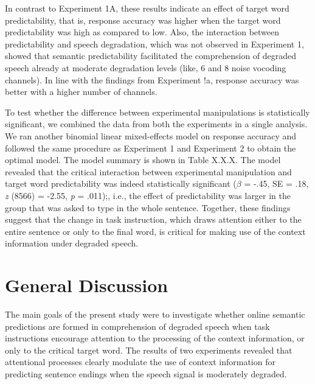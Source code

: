 \documentclass[a4paper, nobind]{templates/ociamthesis}
\begin{document}
In contrast to Experiment 1A, these results indicate an effect of target word predictability, that is, response accuracy was higher when the target word predictability was high as compared to low.
Also, the interaction between predictability and speech degradation, which was not observed in Experiment 1, showed that semantic predictability facilitated the comprehension of degraded speech already at moderate degradation levels (like, 6 and 8 noise vocoding channels).
In line with the findings from Experiment !a, response accuracy was better with a higher number of channels.

To test whether the difference between experimental manipulations is statistically significant, we combined the data from both the experiments in a single analysis.
We ran another binomial linear mixed-effects model on response accuracy and followed the same procedure as Experiment 1 and Experiment 2 to obtain the optimal model.
The model summary is shown in Table X.X.X.
The model revealed that the critical interaction between experimental manipulation and target word predictability was indeed statistically significant (\(\beta\) = -.45, SE = .18, \emph{z} (8566) = -2.55, \emph{p} = .011);, i.e., the effect of predictability was larger in the group that was asked to type in the whole sentence.
Together, these findings suggest that the change in task instruction, which draws attention either to the entire sentence or only to the final word, is critical for making use of the context information under degraded speech.

\hypertarget{general-discussion}{%
\section{General Discussion}\label{general-discussion}}

The main goals of the present study were to investigate whether online semantic predictions are formed in comprehension of degraded speech when task instructions encourage attention to the processing of the context information, or only to the critical target word.
The results of two experiments revealed that attentional processes clearly modulate the use of context information for predicting sentence endings when the speech signal is moderately degraded.
\end{document}
